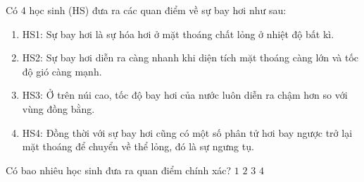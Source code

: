 \begin{ex}
	{\color{red}\footnotesize\ttfamily [L12C1B1-TN-18]}\par %
	Có 4 học sinh (HS) đưa ra các quan điểm về sự bay hơi như sau:
	\begin{enumerate}
		\item  HS1: Sự bay hơi là sự hóa hơi ở mặt thoáng chất lỏng ở nhiệt độ bất kì.
		\item HS2: Sự bay hơi diễn ra càng nhanh khi diện tích mặt thoáng càng lớn và tốc độ gió càng  mạnh.
		\item  HS3: Ở trên núi cao, tốc độ bay hơi của nước luôn diễn ra chậm hơn so với vùng đồng bằng.
		\item HS4: Đồng thời với sự bay hơi cũng có một số phân tử hơi bay ngược trở lại mặt thoáng để chuyển về thể lỏng, đó là sự ngưng tụ.
	\end{enumerate}
	Có bao nhiêu học sinh đưa ra quan điểm chính xác?
	\choice
	{$1$}
	{$2$}
	{\True $3$}
	{$4$}
\end{ex}

